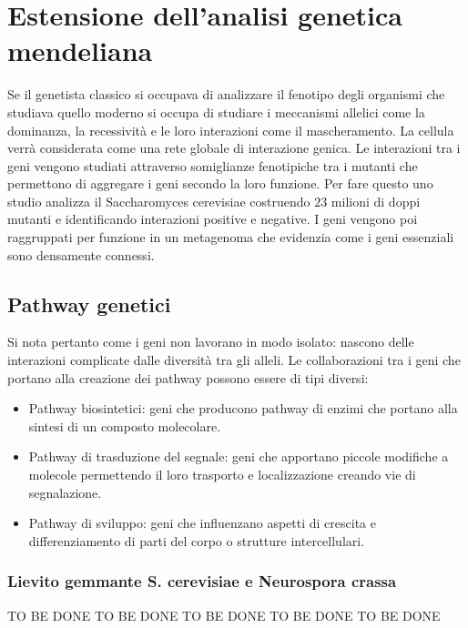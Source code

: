 \chapter{Estensione dell'analisi genetica mendeliana}
Se il genetista classico si occupava di analizzare il fenotipo degli organismi che studiava quello moderno si occupa di studiare i meccanismi allelici come la dominanza, la 
recessivit\`a e le loro interazioni come il mascheramento. La cellula verr\`a considerata come una rete globale di interazione genica. Le interazioni tra i geni vengono studiati 
attraverso somiglianze fenotipiche tra i mutanti che permettono di aggregare i geni secondo la loro funzione. Per fare questo uno studio analizza il Saccharomyces cerevisiae costruendo
$23$ milioni di doppi mutanti e identificando  interazioni positive e  negative. I geni vengono poi raggruppati per funzione in un metagenoma che
evidenzia come i geni essenziali sono densamente connessi. 
\section{Pathway genetici}
Si nota pertanto come i geni non lavorano in modo isolato: nascono delle interazioni complicate dalle diversit\`a tra gli alleli. Le collaborazioni tra i geni che portano alla
creazione dei pathway possono essere di tipi diversi:
\begin{itemize}
	\item Pathway biosintetici: geni che producono pathway di enzimi che portano alla sintesi di un composto molecolare.
	\item Pathway di trasduzione del segnale: geni che apportano piccole modifiche a molecole permettendo il loro trasporto e localizzazione creando vie di segnalazione.
	\item Pathway di sviluppo: geni che influenzano aspetti di crescita e differenziamento di parti del corpo o strutture intercellulari.
\end{itemize}
\subsection{Lievito gemmante S. cerevisiae e Neurospora crassa}
TO BE DONE TO BE DONE TO BE DONE TO BE DONE TO BE DONE\\\\\\\\

